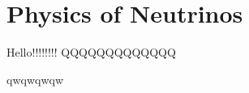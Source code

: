 \chapter{Physics of Neutrinos}
\label{neutrino_physics_chapter}


Hello!!!!!!!!
QQQQQQQQQQQQQ

qwqwqwqw

